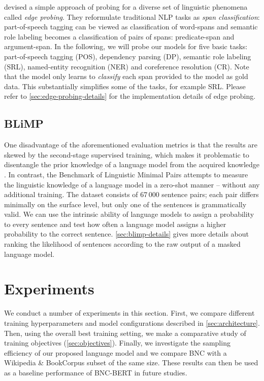      devised a simple approach of probing for a diverse set of linguistic phenomena called \textit{edge probing}. They reformulate traditional NLP tasks as \textit{span classification}: part-of-speech tagging can be viewed as classification of word-spans and semantic role labeling becomes a classification of pairs of spans: predicate-span and argument-span. In the following, we will probe our models for five basic tasks: part-of-speech tagging (POS), dependency parsing (DP), semantic role labeling (SRL), named-entity recognition (NER) and coreference resolution (CR). Note that the model only learns to \textit{classify} each span provided to the model as gold data. This substantially simplifies some of the tasks, for example SRL. Please refer to \cref{sec:edge-probing-details} for the implementation details of edge probing.
 
    
    \subsection{BLiMP}
    \label{sec:blimp}
    
    One disadvantage of the aforementioned evaluation metrics is that the results are skewed by the second-stage supervised training, which makes it problematic to disentangle the prior knowledge of a language model from the acquired knowledge \cite{10.1162/coli_a_00422}. In contrast, the Benchmark of Linguistic Minimal Pairs \citep[BLiMP;][]{warstadt-etal-2020-blimp-benchmark} attempts to measure the linguistic knowledge of a language model in a zero-shot manner -- without any additional training. The dataset consists of 67\,000 sentence pairs; each pair differs minimally on the surface level, but only one of the sentences is grammatically valid. We can use the intrinsic ability of language models to assign a probability to every sentence and test how often a language model assigns a higher probability to the correct sentence. \cref{sec:blimp-details} gives more details about ranking the likelihood of sentences according to the raw output of a masked language model.
    
    \section{Experiments}

    We conduct a number of experiments in this section. First, we compare different training hyperparameters and model configurations described in \cref{sec:architecture}. Then, using the overall best training setting, we make a comparative study of training objectives (\cref{sec:objectives}). Finally, we investigate the sampling efficiency of our proposed language model and we compare BNC with a Wikipedia \& BookCorpus subset of the same size. These results can then be used as a baseline performance of BNC-BERT in future studies.
    
